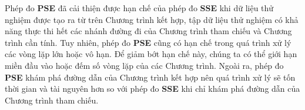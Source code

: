 Phép đo \textbf{PSE} đã cải thiện được hạn chế của phép đo \textbf{SSE} khi dữ liệu thử nghiệm được  tạo ra từ trên Chương trình kết hợp, tập dữ liệu thử nghiệm có khả năng thực thi hết các nhánh đường đi của Chương trình tham chiếu và Chương trình cần tính. Tuy nhiên, phép đo \textbf{PSE} cũng có hạn chế trong quá trình xử lý các vòng lặp lớn hoặc vô hạn. Để giảm bớt hạn chế này, chúng ta có thể giới hạn miền đầu vào hoặc đếm số vòng lặp của các Chương trình. Ngoài ra, phép đo \textbf{PSE} khám phá đường dẫn của Chương trình kết hợp nên quá trình xử lý sẽ tốn thời gian và tài nguyên hơn so với phép đo \textbf{SSE} khi chỉ khám phá đường dẫn của Chương trình tham chiếu.
%
%

